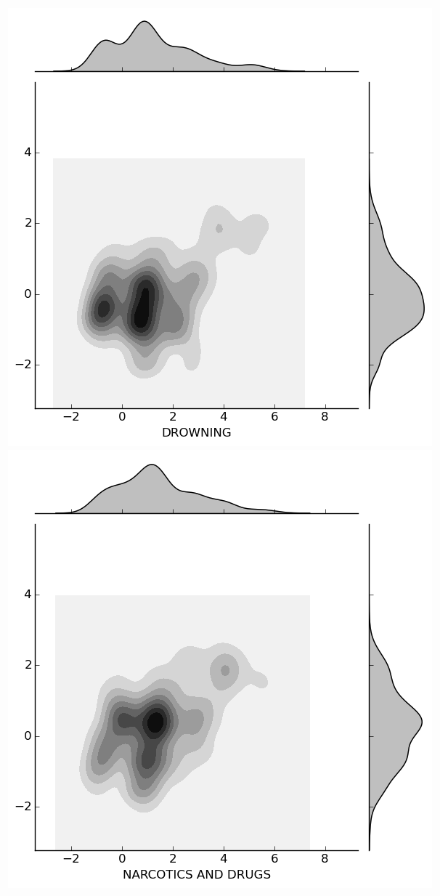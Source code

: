 \documentclass{evanarticle}
\begin{document}
\begin{figure}[H]
\begin{minipage}[b]{0.20\linewidth}
  \end{minipage}
  \quad
  \begin{minipage}[b]{0.20\linewidth}
    \includegraphics[width=\linewidth]{images/weapon/DROWNING.png}
  \end{minipage}
  \quad
  \begin{minipage}[b]{0.20\linewidth}
    \includegraphics[width=\linewidth]{images/weapon/DRUGS.png}
  \end{minipage}


\end{figure}
\end{document}

